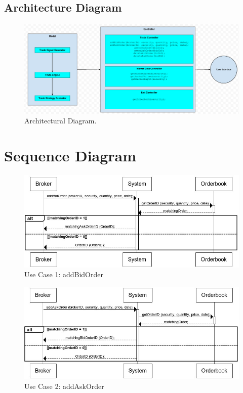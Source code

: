 \documentclass[a4paper]{article}
\begin{document}
\begin {landscape}
\section {Architecture Diagram}
\begin{figure}
  \caption{Architectural Diagram.}
  \centering
    \includegraphics[width=1.6\textwidth]{images/ADiagram}
\end{figure}
\end {landscape}

\section {Sequence Diagram} 

\begin{figure}[h]
  \caption{Use Case 1: addBidOrder}
  \centering
    \includegraphics[width=1\textwidth]{images/addBidOrder}
\end{figure}

\begin{figure}[h]
  \caption{Use Case 2: addAskOrder}
  \centering
    \includegraphics[width=1\textwidth]{images/addAskOrder}
\end{figure}
\end{document}
